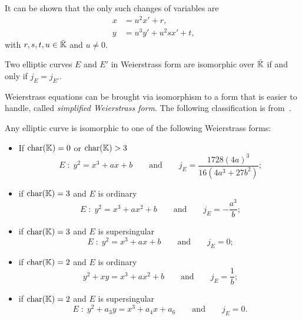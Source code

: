 It can be shown that the only such changes of variables are
\begin{equation}
  \label{eq:116}
  \begin{aligned}
    x &= u^2x' + r\text{,}\\
    y &= u^3y' + u^2sx' + t\text{,}
  \end{aligned}
\end{equation}
with $r,s,t,u\in\bar{\mathbb{K}}$ and $u\ne0$.

\begin{proposition}
  Two elliptic curves $E$ and $E'$ in Weierstrass form are isomorphic
  over $\bar{\mathbb{K}}$ if and only if $j_E=j_{E'}$.
\end{proposition}

Weierstrass equations can be
brought via isomorphism to a form that is easier to handle, called
\emph{simplified Weierstrass form}. The following classification is
from~\cite{connell:elliptic}.

\begin{proposition}
  \label{th:simplified-weierstrass}
  Any elliptic curve is isomorphic to one of the following Weierstrass
  forms:
  \begin{itemize}
  \item If $\operatorname{char}(\mathbb{K})=0$ or $\operatorname{char}(\mathbb{K})>3$
    \begin{equation}
      \label{eq:weierstrass>3}
      E\;:\;y^2 = x^3 + ax + b 
      \qquad\text{and}\qquad
      j_E = \frac{1728(4a)^3}{16(4a^3 + 27b^2)}
      \text{;}
    \end{equation}
  \item if $\operatorname{char}(\mathbb{K})=3$ and $E$ is ordinary
    \begin{equation}
      \label{eq:weierstrass=3}
      E\;:\;y^2 = x^3 + ax^2 + b
      \qquad\text{and}\qquad
      j_E = -\frac{a^3}{b}
      \text{;}
    \end{equation}
  \item if $\operatorname{char}(\mathbb{K})=3$ and $E$ is supersingular
    \begin{equation}
      \label{eq:136}
      E\;:\;y^2=x^3 + ax+b
      \qquad\text{and}\qquad
      j_E=0
      \text{;}
    \end{equation}
  \item if $\operatorname{char}(\mathbb{K})=2$ and $E$ is ordinary
    \begin{equation}
      \label{eq:weierstrass=2}
      y^2 + xy = x^3 + ax^2 + b
      \qquad\text{and}\qquad
      j_E = \frac{1}{b}
      \text{;}
    \end{equation}
  \item if $\operatorname{char}(\mathbb{K})=2$ and $E$ is supersingular
    \begin{equation}
      \label{eq:137}
      E\;:\; y^2 + a_3y = x^3 + a_4x + a_6
      \qquad\text{and}\qquad
      j_E = 0
      \text{.}
    \end{equation}
  \end{itemize}
\end{proposition}

